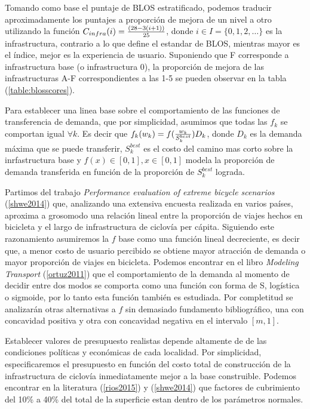 \documentclass{article}
\begin{document}
  Tomando como base el puntaje de BLOS estratificado, podemos traducir aproximadamente los puntajes a proporción de mejora de un nivel a otro utilizando la función $C_{infra}(i) = {(28 - 3 (i + 1)) \over 25}$, donde $i \in I = \{0,1,2,\ldots\}$ es la infrastructura, contrario a lo que define el estandar de BLOS, mientras mayor es el índice, mejor es la experiencia de usuario. Suponiendo que F corresponde a infrastructura base (o infrastructura 0), la proporción de mejora de las infrastructuras A-F correspondientes a las 1-5 se pueden observar en la tabla  (\ref{table:blosscores}).

  Para establecer una linea base sobre el comportamiento de las funciones de transferencia de demanda, que por simplicidad, asumimos que todas las $f_k$ se comportan igual $\forall k$. Es decir que $f_k(w_k) = f({w_k \over S^{best}_k})D_k$, donde $D_k$ es la demanda máxima que se puede transferir, $S^{best}_k$ es el costo del camino mas corto sobre la inrfastructura base y $f(x) \in [0, 1], x \in [0, 1]$ modela la proporción de demanda transferida en función de la proporción de $S^{best}_k$ lograda.

  Partimos del trabajo {\it Performance evaluation of extreme bicycle scenarios} (\ref{shwe2014}) que, analizando una extensiva encuesta realizada en varios países, aproxima a grosomodo una relación lineal entre la proporción de viajes hechos en bicicleta y el largo de infrastructura de ciclovía per cápita. Siguiendo este razonamiento asumiremos la $f$ base como una función lineal decreciente, es decir que, a menor costo de usuario percibido se obtiene mayor atracción de demanda o mayor proporción de viajes en bicicleta. Podemos encontrar en el libro {\it Modeling Transport} (\ref{ortuz2011}) que el comportamiento de la demanda al momento de decidir entre dos modos se comporta como una función con forma de S, logística o sigmoide, por lo tanto esta función también es estudiada. Por completitud se analizarán otras alternativas a $f$ sin demasiado fundamento bibliográfico, una con concavidad positiva y otra con concavidad negativa en el intervalo $[m, 1]$.

  Establecer valores de presupuesto realistas depende altamente de de las condiciones políticas y económicas de cada localidad. Por simplicidad, especificaremos el presupuesto en función del costo total de construcción de la infrastructura de ciclovía inmediatamente mejor a la base construible. Podemos encontrar en la literatura (\ref{rios2015}) y (\ref{shwe2014}) que factores de cubrimiento del 10\% a 40\% del total de la superficie estan dentro de los parámetros normales.
\end{document}

